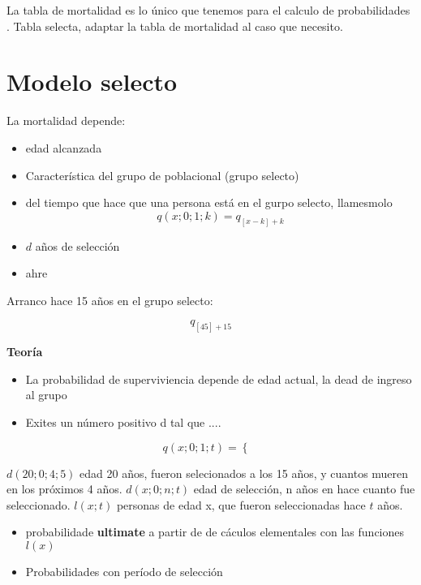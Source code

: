 La tabla de mortalidad es lo único que tenemos para el calculo de probabilidades . 
Tabla selecta, adaptar la tabla de mortalidad al caso que necesito.

\section{Modelo selecto}

La mortalidad depende: 

\begin{itemize}
	\item edad alcanzada
	\item Característica del grupo de poblacional (grupo selecto)
	\item del tiempo que hace que una persona está en el gurpo selecto, llamesmolo 
		\begin{equation}
			q(x; 0; 1; k)	 = q_{[x-k]+k}
		\end{equation}
	\item  $d$  años de selección
		\item ahre
\end{itemize}

Arranco hace 15 años en el grupo selecto:

\begin{equation}
	q_{[45]+15}
\end{equation}


\textbf{Teoría} 

\begin{itemize}
	\item La probabilidad de superviviencia depende de edad actual, la dead de ingreso al grupo
	\item  Exites un número positivo d tal que ....
\end{itemize}

\begin{equation}
	q(x;0;1;t) = \begin{cases}
		

	\end{cases}
\end{equation}

$d(20;0;4;5)$ edad 20 años, fueron selecionados a los 15 años, y cuantos mueren en los próximos 4 años.
$d(x;0;n;t)$ edad de selección,  n años en hace cuanto fue seleccionado. 
$l(x;t)$ personas de edad x, que fueron seleccionadas hace  $t$  años. 

\begin{itemize}
	\item  probabilidade \textbf{ultimate} a partir de  de cáculos elementales con las funciones $l(x)$ 
	\item  Probabilidades con período de selección
\end{itemize}



